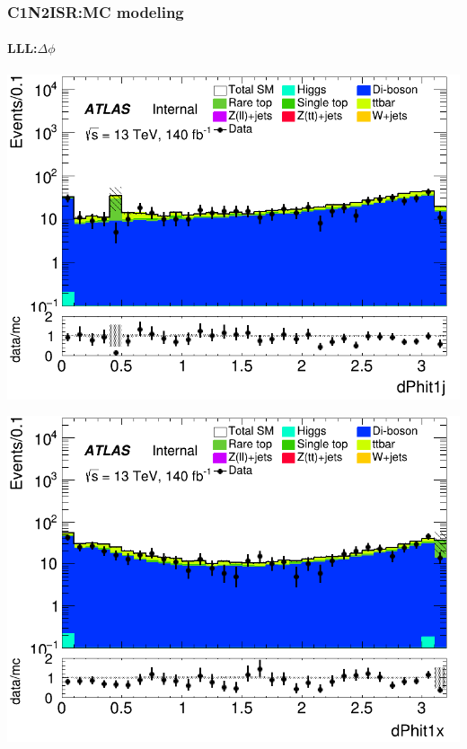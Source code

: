 \documentclass[usenames,dvipsnames]{beamer}
\begin{document}
\begin{frame}
\frametitle{C1N2ISR:MC modeling}
\framesubtitle{LLL:\quad $\Delta\phi$}
    \begin{minipage}{0.32\textwidth}
        \centering
        \includegraphics[width=\textwidth]{graphics/LLL_met/LLL_met_dPhit1j.png}
    \end{minipage}
    \hfill
    \begin{minipage}{0.32\textwidth}
        \centering
        \includegraphics[width=\textwidth]{graphics/LLL_met/LLL_met_dPhit1x.png}
    \end{minipage}
    \hfill
    \begin{minipage}{0.32\textwidth}
        \centering

\end{minipage}
\end{frame}
\end{document}

